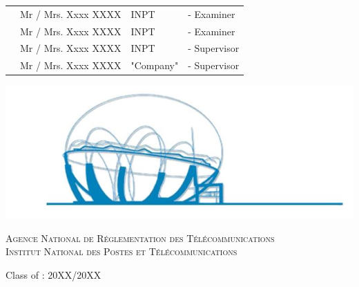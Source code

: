 \begin{center}
\begin{tabular}{p{1cm}lll}
 & \large Mr / Mrs. Xxxx \textsc{XXXX}  & \large INPT & \large - Examiner \\[0.1cm]
 & \large Mr / Mrs. Xxxx \textsc{XXXX}  & \large INPT & \large - Examiner \\[0.1cm]
 & \large Mr / Mrs. Xxxx \textsc{XXXX}  & \large INPT & \large - Supervisor \\[0.1cm]
  & \large Mr / Mrs. Xxxx \textsc{XXXX}  & \large "Company" & \large - Supervisor \\[0.1cm]
 
\end{tabular}

\vspace{0.5cm}
\includegraphics[scale=0.6]{Logos/ZLAFA.png}


\textsc{Agence National de Réglementation des Télécommunications}\\
\textsc{Institut National des Postes et Télécommunications}

{\large Class of : 20XX/20XX}
   
\end{center}


